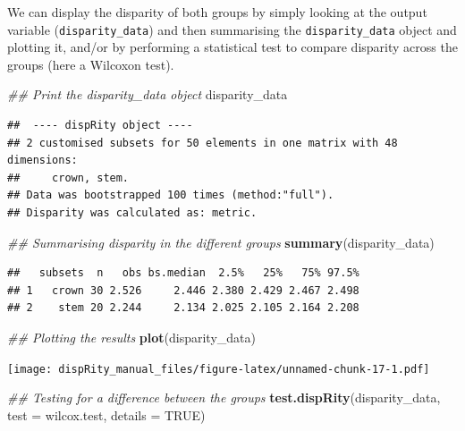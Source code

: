 \documentclass[]{book}
\newenvironment{Shaded}{\begin{snugshade}}{\end{snugshade}}
\newcommand{\CommentTok}[1]{\textcolor[rgb]{0.56,0.35,0.01}{\textit{#1}}}
\newcommand{\DataTypeTok}[1]{\textcolor[rgb]{0.13,0.29,0.53}{#1}}
\newcommand{\KeywordTok}[1]{\textcolor[rgb]{0.13,0.29,0.53}{\textbf{#1}}}
\newcommand{\NormalTok}[1]{#1}
\newcommand{\OtherTok}[1]{\textcolor[rgb]{0.56,0.35,0.01}{#1}}
\begin{document}
We can display the disparity of both groups by simply looking at the output variable (\texttt{disparity\_data}) and then summarising the \texttt{disparity\_data} object and plotting it, and/or by performing a statistical test to compare disparity across the groups (here a Wilcoxon test).

\begin{Shaded}
\begin{Highlighting}[]
\CommentTok{## Print the disparity_data object}
\NormalTok{disparity_data}
\end{Highlighting}
\end{Shaded}

\begin{verbatim}
##  ---- dispRity object ---- 
## 2 customised subsets for 50 elements in one matrix with 48 dimensions:
##     crown, stem.
## Data was bootstrapped 100 times (method:"full").
## Disparity was calculated as: metric.
\end{verbatim}

\begin{Shaded}
\begin{Highlighting}[]
\CommentTok{## Summarising disparity in the different groups}
\KeywordTok{summary}\NormalTok{(disparity_data)}
\end{Highlighting}
\end{Shaded}

\begin{verbatim}
##   subsets  n   obs bs.median  2.5%   25%   75% 97.5%
## 1   crown 30 2.526     2.446 2.380 2.429 2.467 2.498
## 2    stem 20 2.244     2.134 2.025 2.105 2.164 2.208
\end{verbatim}

\begin{Shaded}
\begin{Highlighting}[]
\CommentTok{## Plotting the results}
\KeywordTok{plot}\NormalTok{(disparity_data)}
\end{Highlighting}
\end{Shaded}

\texttt{[image: dispRity\_manual\_files/figure-latex/unnamed-chunk-17-1.pdf]}

\begin{Shaded}
\begin{Highlighting}[]
\CommentTok{## Testing for a difference between the groups}
\KeywordTok{test.dispRity}\NormalTok{(disparity_data, }\DataTypeTok{test =}\NormalTok{ wilcox.test, }\DataTypeTok{details =} \OtherTok{TRUE}\NormalTok{)}
\end{Highlighting}
\end{Shaded}
\end{document}
